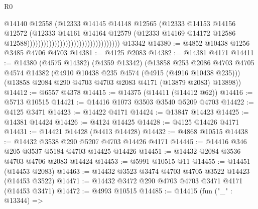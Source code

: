 \begin{lexlean}{R0}
\begin{coremodule}
                                                                @14140
                                                                @12558
                                                                (@12333
                                                                  @14145
                                                                  @14148
                                                                  @12565
                                                                  (@12333
                                                                    @14153
                                                                    @14156
                                                                    @12572
                                                                    (@12333
                                                                      @14161
                                                                      @14164
                                                                      @12579
                                                                      (@12333
                                                                        @14169
                                                                        @14172
                                                                        @12586
                                                                        @12588))))))))))))))))))))))))))))))))))
    @13342
@14380 := @4852 @10438 @1256 @3485 @4706 @4703
@14381 := @4125 @2083
@14382 := @14381 @4171
@14411 := @14380
    (@4575 @14382)
    (@4359 @13342)
    (@13858
      @253
      @2086
      @4703
      @4705
      @4574
      @14382
      (@4910 @10438 @235 @4574 (@4915 (@4916 @10438 @235)))
      (@13858 @2084 @290 @4703 @4703 @2083 @4171 (@13879 @2083) @13898))
@14412 := @6557 @4378
@14415 := @14375 (@14411 (@14412 @62))
@14416 := @5713 @10515
@14421 := @14416 @1073 @3503 @3540 @5209 @4703
@14422 := @4125 @3471
@14423 := @14422 @4171
@14424 := @13847 @14423
@14425 := @14381 @14424
@14426 := @4124 @14425
@14428 := @4125 @14426 @4171
@14431 := @14421 @14428 (@4413 @14428)
@14432 := @4868 @10515
@14438 := @14432 @3538 @290 @5207 @4703 @14426 @4171
@14445 := @14416 @346 @205 @3537 @5184 @4703 @14425 @14426
@14451 := @14432 @2084 @3536 @4703 @4706 @2083 @14424
@14453 := @5991 @10515 @11
@14455 := @14451 (@14453 @2083)
@14463 := @14432 @3523 @3474 @4703 @4705 @3522 @14423 (@14453 @3522)
@14471 := @14432 @3472 @290 @4703 @4703 @3471 @4171 (@14453 @3471)
@14472 := @4993 @10515
@14485 := @14415
    (fun ("_" : @13344) =>

\end{coremodule}
\end{lexlean}

